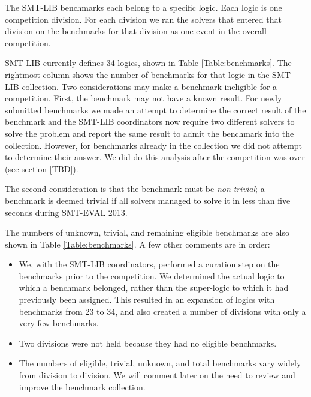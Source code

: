 \documentclass[twosize,11pt]{article}
\begin{document}
The SMT-LIB benchmarks each belong to a specific logic. Each logic is one competition division. For each division we ran the solvers that entered that division on the benchmarks for that division as one event in the overall competition.

SMT-LIB currently defines 34 logics, shown in Table \ref{Table:benchmarks}. The rightmost column shows the number of benchmarks for that logic in the SMT-LIB collection. Two considerations may make a benchmark ineligible for a competition. First, the benchmark may not have a known result. For newly submitted benchmarks
we made an attempt to determine the correct result of the benchmark and the SMT-LIB coordinators now require two 
different solvers to solve the problem and report the same result to admit the benchmark into the collection.
However, for benchmarks already in the collection we did not attempt to determine their answer. We did do this analysis after the competition was over (see section \ref{TBD}).

The second consideration is that the benchmark must be \textit{non-trivial}; a benchmark is deemed trivial if all solvers managed to solve it in less than five seconds during SMT-EVAL 2013.

The numbers of unknown, trivial, and remaining eligible benchmarks are also shown in Table \ref{Table:benchmarks}. A few other comments are in order:
\begin{itemize}
\item We, with the SMT-LIB coordinators, performed a curation step on the benchmarks prior to the competition. We determined the actual logic to which a benchmark belonged, rather than the super-logic to which it had previously been assigned. This resulted in an expansion of logics with benchmarks from 23 to 34, and also created a number of divisions with only a very few benchmarks.
\item Two divisions were not held because they had no eligible benchmarks.
\item The numbers of eligible, trivial, unknown, and total benchmarks vary widely from division to division. We will comment later on the need to review and improve the benchmark collection.
\end{itemize}
\end{document}
